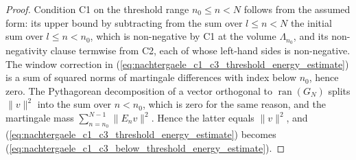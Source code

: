 \begin{proof}
    \leanok
    Condition C1 on the threshold range $n_0\leq n<N$ follows from the
    assumed form: its upper bound by subtracting from the sum over
    $l\leq n<N$ the initial sum over $l\leq n<n_0$, which is non-negative by
    C1 at the volume $\Lambda_{n_0}$, and its non-negativity clause termwise
    from C2, each of whose left-hand sides is non-negative. The window
    correction in
    (\ref{eq:nachtergaele_c1_c3_threshold_energy_estimate}) is a sum of
    squared norms of martingale differences with index below $n_0$, hence
    zero. The Pythagorean decomposition of a vector orthogonal to
    $\operatorname{ran}(G_N)$ splits $\lVert v\rVert^2$ into the sum over
    $n<n_0$, which is zero for the same reason, and the martingale mass
    $\sum_{n=n_0}^{N-1}\lVert E_nv\rVert^2$. Hence the latter equals
    $\lVert v\rVert^2$, and
    (\ref{eq:nachtergaele_c1_c3_threshold_energy_estimate}) becomes
    (\ref{eq:nachtergaele_c1_c3_below_threshold_energy_estimate}).
\end{proof}

